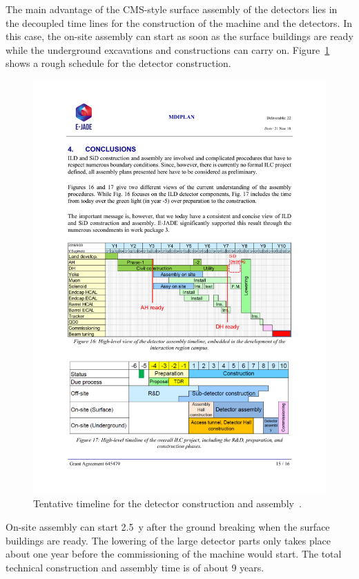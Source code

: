 The main advantage of the CMS-style surface assembly of the detectors lies in the decoupled time lines for the construction of the machine and the detectors. In this case, the on-site assembly can start as soon as the surface buildings are ready while the underground excavations and constructions can carry on. Figure~\ref{fig:integration:assembly_timeline} shows a rough schedule for the detector construction.
\begin{figure}[h!]
\centering
\includegraphics[width=0.8\hsize]{Integration/fig/assembly_timeline.pdf}
\caption{\label{fig:integration:assembly_timeline}Tentative timeline for the detector construction and assembly~\cite{ild:bib:ejade_mdi}.}
\end{figure}
On-site assembly can start 2.5~y after the ground breaking when the surface buildings are ready. The lowering of the large detector parts only takes place about one year before the commissioning of the machine would start. The total technical construction and assembly time is of about 9 years.